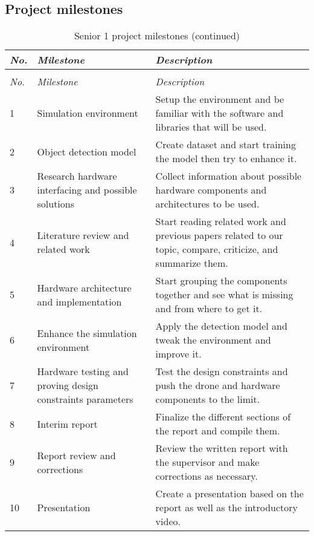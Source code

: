\documentclass[../main.tex]{subfiles}
\begin{document}
\subsection{Project milestones}

\begin{center}
    \begin{xltabular}{\textwidth}{ X p{5cm} p{9cm} }
        \caption{Senior 1 project milestones.}
        \label{tab:milestones} \\
        \toprule

        \textit{No.} & \textit{Milestone} 
            & \textit{Description}
        \\

        \midrule
        \endfirsthead

        \caption[]{Senior 1 project milestones (continued)} \\
        \toprule

        \textit{No.} & \textit{Milestone} 
            & \textit{Description}
        \\

        \midrule
        \endhead

        1 & Simulation environment
            & Setup the environment and be familiar with 
            the software and libraries that will be used.
        \\
        2 & Object detection model
            & Create dataset and start training the model 
            then try to enhance it.
        \\
        3 & Research hardware interfacing and possible 
        solutions
            & Collect information about possible hardware 
            components and architectures to be used.
        \\
        4 & Literature review and related work
            & Start reading related work and previous papers 
            related to our topic, compare, criticize, and 
            summarize them.
        \\
        5 & Hardware architecture and implementation
            & Start grouping the components together 
            and see what is missing and from where to get it.
        \\
        6 & Enhance the simulation environment
            & Apply the detection model and tweak 
            the environment and improve it.
        \\
        7 & Hardware testing and proving design constraints 
        parameters
            & Test the design constraints and push the 
            drone and hardware components to the limit.
        \\
        8 & Interim report
            & Finalize the different sections of the report
            and compile them.
        \\
        9 & Report review and corrections
            & Review the written report with the supervisor
            and make corrections as necessary.
        \\
        10 & Presentation
            & Create a presentation based on the report
            as well as the introductory video.
        \\


\end{xltabular}
\end{center}
\end{document}
